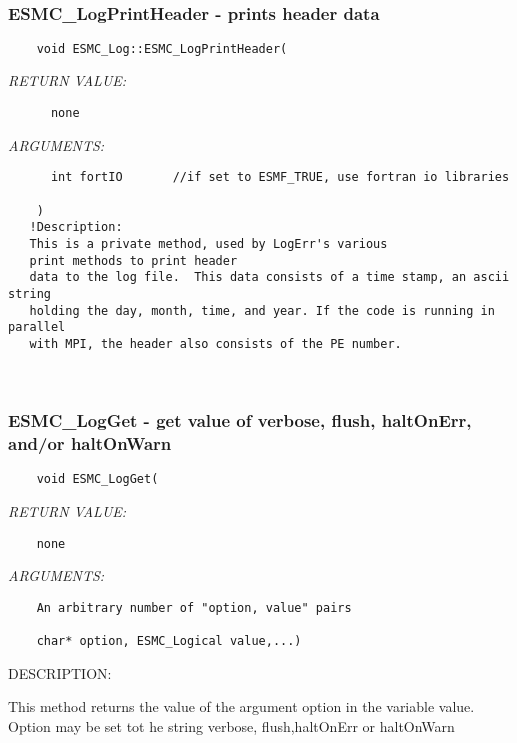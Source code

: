    
 
\mbox{}\hrulefill\ 
 
\subsubsection [ESMC\_LogPrintHeader] {ESMC\_LogPrintHeader - prints header data}


  
\begin{verbatim}    void ESMC_Log::ESMC_LogPrintHeader(\end{verbatim}{\em RETURN VALUE:}
\begin{verbatim}      none \end{verbatim}{\em ARGUMENTS:}
\begin{verbatim}      int fortIO       //if set to ESMF_TRUE, use fortran io libraries
 
    )
   !Description:
   This is a private method, used by LogErr's various
   print methods to print header
   data to the log file.  This data consists of a time stamp, an ascii string 
   holding the day, month, time, and year. If the code is running in parallel
   with MPI, the header also consists of the PE number.\end{verbatim}
 
 
\mbox{}\hrulefill\ 
 
\subsubsection [ESMC\_LogGet] {ESMC\_LogGet - get value of verbose, flush, haltOnErr, and/or haltOnWarn}


  
\begin{verbatim}    void ESMC_LogGet(\end{verbatim}{\em RETURN VALUE:}
\begin{verbatim}    none\end{verbatim}{\em ARGUMENTS:}
\begin{verbatim}    An arbitrary number of "option, value" pairs
 
    char* option, ESMC_Logical value,...)
   \end{verbatim}
{\sf DESCRIPTION:\\ }


    This method returns the value of the argument option in the variable value.
    Option may be set tot he string verbose, flush,haltOnErr or haltOnWarn 
 
